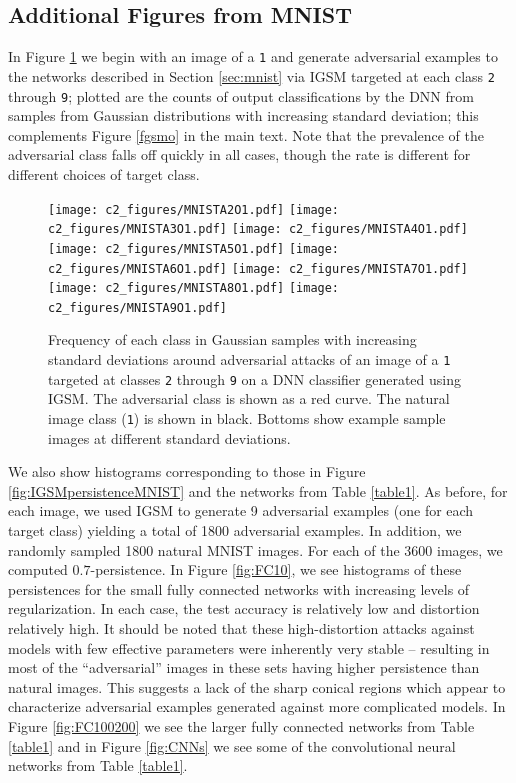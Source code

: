 \subsection{Additional Figures from MNIST}
In Figure \ref{fig:mnistadv} we begin with an image of a \texttt{1} and generate adversarial examples to the networks described in Section \ref{sec:mnist} via IGSM targeted at each class \texttt{2} through \texttt{9}; plotted are the counts of output classifications by the DNN from samples from Gaussian distributions with increasing standard deviation; this complements Figure \ref{fgsmo} in the main text. Note that the prevalence of the adversarial class falls off quickly in all cases, though the rate is different for different choices of target class.
\begin{figure}[!htb]
    \centering
    \texttt{[image: c2\_figures/MNISTA2O1.pdf]}
    \texttt{[image: c2\_figures/MNISTA3O1.pdf]}
    \texttt{[image: c2\_figures/MNISTA4O1.pdf]}
    \texttt{[image: c2\_figures/MNISTA5O1.pdf]}
    \texttt{[image: c2\_figures/MNISTA6O1.pdf]}
    \texttt{[image: c2\_figures/MNISTA7O1.pdf]}
    \texttt{[image: c2\_figures/MNISTA8O1.pdf]}
    \texttt{[image: c2\_figures/MNISTA9O1.pdf]}
    \caption{Frequency of each class in Gaussian samples with increasing standard deviations around adversarial attacks of an image of a \texttt{1} targeted at classes \texttt{2} through \texttt{9} on a DNN classifier generated using IGSM. The adversarial class is shown as a red curve. The natural image class (\texttt{1}) is shown in black. Bottoms show example sample images at different standard deviations.}
    \label{fig:mnistadv}
\end{figure}

We also show histograms corresponding to those in Figure \ref{fig:IGSMpersistenceMNIST} and the networks from Table \ref{table1}.  As before, for each image, we used IGSM to generate 9 adversarial examples (one for each target class) yielding a total of 1800 adversarial examples. In addition, we randomly sampled 1800 natural MNIST images. For each of the 3600 images, we computed $0.7$-persistence. In Figure \ref{fig:FC10}, we see histograms of these persistences for the small fully connected networks with increasing levels of regularization. In each case, the test accuracy is relatively low and distortion relatively high. It should be noted that these high-distortion attacks against models with few effective parameters were inherently very stable -- resulting in most of the ``adversarial'' images in these sets having higher persistence than natural images. This suggests a lack of the sharp conical regions which appear to characterize adversarial examples generated against more complicated models.  In Figure \ref{fig:FC100200} we see the larger fully connected networks from Table \ref{table1} and in Figure \ref{fig:CNNs} we see some of the convolutional neural networks from Table \ref{table1}. 

